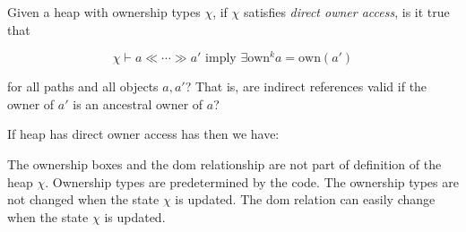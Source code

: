 \frmrule 


\begin{example}
Given a heap with ownership types $\chi$, if 
$\chi$ satisfies \textit{direct owner access}, is it true that

$$\chi \vdash a \ll \dotsm \gg a'  \text{ imply } \exists \text{own}^k{a} = \text{own}(a')$$

for all paths and all objects $a, a'$? 
That is, are indirect references valid if the owner of $a'$ is an ancestral owner of $a$?
\end{example}



\frmrule 

If heap has direct owner access has then we have:


The ownership boxes and the dom relationship are not part of 
definition of the heap $\chi$. Ownership types are predetermined 
by the code. The ownership types are not changed when the 
state $\chi$ is updated. 
The dom relation can easily change when the state $\chi$ is updated.

